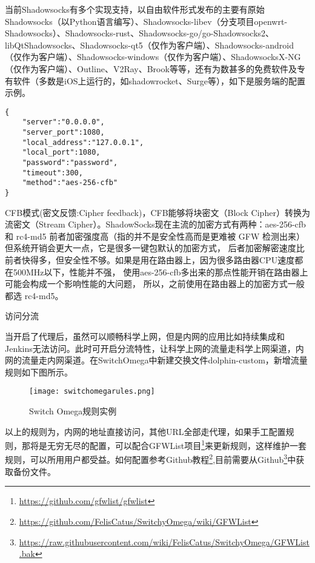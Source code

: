 \documentclass[8pt]{book}
\makeatletter
\numberwithin{dummy}{section}
\theoremstyle{ocrenumbox}
\theoremstyle{blacknumex}
\theoremstyle{blacknumbox}
\theoremstyle{ocrenum}
\renewcommand{\subsubsection}{\@startsection {subsubsection}{3}{\z@}
	{-2ex \@plus -0.1ex \@minus -.2ex}
	{.2ex \@plus.2ex }
	{\normalfont\small\sffamily\bfseries}}
\makeatother
\begin{document}
当前Shadowsocks有多个实现支持，以自由软件形式发布的主要有原始Shadowsocks（以Python语言编写）、Shadowsocks-libev（分支项目openwrt-Shadowsocks）、Shadowsocks-rust、Shadowsocks-go/go-Shadowsocks2、libQtShadowsocks、Shadowsocks-qt5（仅作为客户端）、Shadowsocks-android（仅作为客户端）、Shadowsocks-windows（仅作为客户端）、ShadowsocksX-NG（仅作为客户端）、Outline、V2Ray、Brook等等，还有为数甚多的免费软件及专有软件（多数是iOS上运行的，如shadowrocket、Surge等），如下是服务端的配置示例。

\begin{lstlisting}
{
	"server":"0.0.0.0",
	"server_port":1080,
	"local_address":"127.0.0.1",
	"local_port":1080,
	"password":"password",
	"timeout":300,
	"method":"aes-256-cfb"
}
\end{lstlisting}

CFB模式(密文反馈:Cipher feedback)，CFB能够将块密文（Block Cipher）转换为流密文（Stream Cipher）。ShadowSocks现在主流的加密方式有两种：aes-256-cfb 和 rc4-md5 前者加密强度高（指的并不是安全性高而是更难被 GFW 检测出来）
但系统开销会更大一点，它是很多一键包默认的加密方式，
后者加密解密速度比前者快得多，但安全性不够。如果是用在路由器上，因为很多路由器CPU速度都在500MHz以下，性能并不强，
使用aes-256-cfb多出来的那点性能开销在路由器上可能会构成一个影响性能的大问题，
所以，之前使用在路由器上的加密方式一般都选 rc4-md5。

\subsubsection{访问分流}

当开启了代理后，虽然可以顺畅科学上网，但是内网的应用比如持续集成和Jenkins无法访问。此时可开启分流特性，让科学上网的流量走科学上网渠道，内网的流量走内网渠道。在SwitchOmega中新建交换文件dolphin-custom，新增流量规则如下图所示。

\begin{figure}[htbp]
	\centering
	\texttt{[image: switchomegarules.png]}
	\caption{Switch Omega规则实例}
	\label{fig:switchomegarules}
\end{figure}

以上的规则为，内网的地址直接访问，其他URL全部走代理，如果手工配置规则，那将是无穷无尽的配置，可以配合GFWList项目\footnote{\url{https://github.com/gfwlist/gfwlist}}来更新规则，这样维护一套规则，可以所用用户都受益。如何配置参考Github教程\footnote{\url{https://github.com/FelisCatus/SwitchyOmega/wiki/GFWList}},目前需要从Github\footnote{\url{https://raw.githubusercontent.com/wiki/FelisCatus/SwitchyOmega/GFWList.bak}}中获取备份文件。
\end{document}
